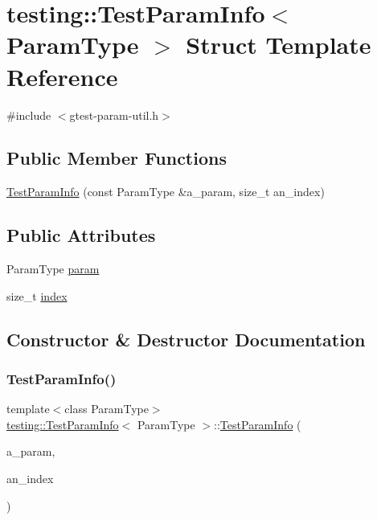 \hypertarget{structtesting_1_1TestParamInfo}{}\section{testing\+:\+:Test\+Param\+Info$<$ Param\+Type $>$ Struct Template Reference}
\label{structtesting_1_1TestParamInfo}


{\ttfamily \#include $<$gtest-\/param-\/util.\+h$>$}

\subsection*{Public Member Functions}
\begin{DoxyCompactItemize}
\item 
\hyperlink{structtesting_1_1TestParamInfo_aa54199319bcad5a33c8538ecaecb6de5}{Test\+Param\+Info} (const Param\+Type \&a\+\_\+param, size\+\_\+t an\+\_\+index)
\end{DoxyCompactItemize}
\subsection*{Public Attributes}
\begin{DoxyCompactItemize}
\item 
Param\+Type \hyperlink{structtesting_1_1TestParamInfo_a146d921039f9da8b1336f7cc6e8436c2}{param}
\item 
size\+\_\+t \hyperlink{structtesting_1_1TestParamInfo_ad4d7bc02cbcc571eb3c1d2ec3ba5bb53}{index}
\end{DoxyCompactItemize}


\subsection{Constructor \& Destructor Documentation}
\mbox{\label{structtesting_1_1TestParamInfo_aa54199319bcad5a33c8538ecaecb6de5}} 
\subsubsection{\texorpdfstring{Test\+Param\+Info()}{TestParamInfo()}}
{\footnotesize\ttfamily template$<$class Param\+Type$>$ \\
\hyperlink{structtesting_1_1TestParamInfo}{testing\+::\+Test\+Param\+Info}$<$ Param\+Type $>$\+::\hyperlink{structtesting_1_1TestParamInfo}{Test\+Param\+Info} (\begin{DoxyParamCaption}\item[{const Param\+Type \&}]{a\+\_\+param,  }\item[{size\+\_\+t}]{an\+\_\+index }\end{DoxyParamCaption})\hspace{0.3cm}{\ttfamily [inline]}}



